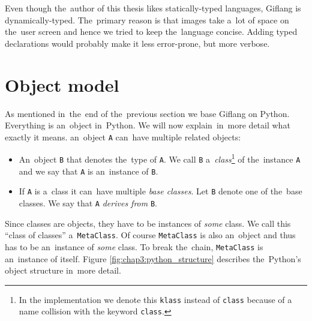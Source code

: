 Even though the~author of this thesis likes statically-typed languages, Giflang is dynamically-typed. The~primary reason is that images take a~lot of
space on the~user screen and hence we tried to keep the~language concise. Adding typed declarations would probably make it less error-prone, but more verbose.

\section{Object model}
\label{chap3:object_model}
As mentioned in~the~end of the~previous section we base Giflang on Python. Everything is an~object in~Python. We will now explain~in~more detail what exactly
it means. an~object \texttt{A} can~have multiple related objects:
\begin{itemize}
    \item An~object \texttt{B} that denotes the~type of \texttt{A}. We call \texttt{B} a~\emph{class}\footnote{In the implementation we denote this \texttt{klass}
    instead of \texttt{class} because of a name collision with the keyword \texttt{class}.} of the~instance \texttt{A} and we say that \texttt{A}
    is an~instance of \texttt{B}.
    \item If \texttt{A} is a~class it can~have multiple \emph{base classes}. Let \texttt{B} denote one of the~base classes. We say that \texttt{A}
    \emph{derives from} \texttt{B}. 
\end{itemize}

Since classes are objects, they have to be instances of \emph{some} class. We call this ``class of classes'' a~\texttt{MetaClass}. Of course
\texttt{MetaClass} is also an~object and thus has to be an~instance of \emph{some} class. To break the~chain, \texttt{MetaClass} is an~instance of itself.
Figure \ref{fig:chap3:python_structure} describes the~Python's object structure in~more detail.


